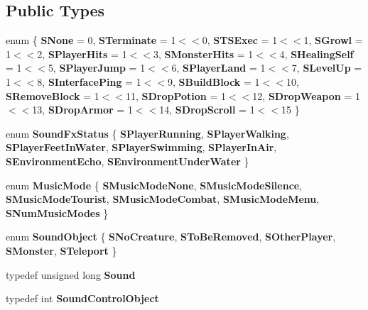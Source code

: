 \subsection*{\-Public \-Types}
\begin{DoxyCompactItemize}
\item 
enum \{ \*
{\bfseries \-S\-None} =  0, 
{\bfseries \-S\-Terminate} =  1$<$$<$0, 
{\bfseries \-S\-T\-S\-Exec} =  1$<$$<$1, 
{\bfseries \-S\-Growl} =  1$<$$<$2, 
\*
{\bfseries \-S\-Player\-Hits} =  1$<$$<$3, 
{\bfseries \-S\-Monster\-Hits} =  1$<$$<$4, 
{\bfseries \-S\-Healing\-Self} =  1$<$$<$5, 
{\bfseries \-S\-Player\-Jump} =  1$<$$<$6, 
\*
{\bfseries \-S\-Player\-Land} =  1$<$$<$7, 
{\bfseries \-S\-Level\-Up} =  1$<$$<$8, 
{\bfseries \-S\-Interface\-Ping} =  1$<$$<$9, 
{\bfseries \-S\-Build\-Block} =  1$<$$<$10, 
\*
{\bfseries \-S\-Remove\-Block} =  1$<$$<$11, 
{\bfseries \-S\-Drop\-Potion} =  1$<$$<$12, 
{\bfseries \-S\-Drop\-Weapon} =  1$<$$<$13, 
{\bfseries \-S\-Drop\-Armor} =  1$<$$<$14, 
\*
{\bfseries \-S\-Drop\-Scroll} =  1$<$$<$15
 \}
\item 
enum {\bfseries \-Sound\-Fx\-Status} \{ \*
{\bfseries \-S\-Player\-Running}, 
{\bfseries \-S\-Player\-Walking}, 
{\bfseries \-S\-Player\-Feet\-In\-Water}, 
{\bfseries \-S\-Player\-Swimming}, 
\*
{\bfseries \-S\-Player\-In\-Air}, 
{\bfseries \-S\-Environment\-Echo}, 
{\bfseries \-S\-Environment\-Under\-Water}
 \}
\item 
enum {\bfseries \-Music\-Mode} \{ \*
{\bfseries \-S\-Music\-Mode\-None}, 
{\bfseries \-S\-Music\-Mode\-Silence}, 
{\bfseries \-S\-Music\-Mode\-Tourist}, 
{\bfseries \-S\-Music\-Mode\-Combat}, 
\*
{\bfseries \-S\-Music\-Mode\-Menu}, 
{\bfseries \-S\-Num\-Music\-Modes}
 \}
\item 
enum {\bfseries \-Sound\-Object} \{ \*
{\bfseries \-S\-No\-Creature}, 
{\bfseries \-S\-To\-Be\-Removed}, 
{\bfseries \-S\-Other\-Player}, 
{\bfseries \-S\-Monster}, 
\*
{\bfseries \-S\-Teleport}
 \}
\item 
\hypertarget{classSoundControl_af69a989ea5ea79299d9f05cf5ca53fe9}{typedef unsigned long {\bfseries \-Sound}}\label{classSoundControl_af69a989ea5ea79299d9f05cf5ca53fe9}

\item 
\hypertarget{classSoundControl_a12ae80d6698edc774909032635995884}{typedef int {\bfseries \-Sound\-Control\-Object}}\label{classSoundControl_a12ae80d6698edc774909032635995884}

\end{DoxyCompactItemize}
